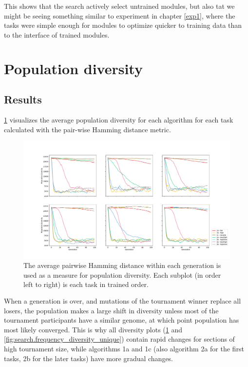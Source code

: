 This shows that the search actively select untrained modules, but also tat we might be seeing something similar to experiment in chapter \ref{exp1}, where the tasks were simple enough for modules to optimize quicker to training data than to the interface of trained modules.

\section{Population diversity}
\label{exp2:diversity}
\subsection{Results}
\ref{fig:search.hamming_diversity} visualizes the average population diversity for each algorithm for each task calculated with the pair-wise Hamming distance metric. 

\begin{figure}
    \includegraphics[width=1.2\textwidth,center]{Chapters/4.Experiments/exp2/figures/large/Average_population_diversity_reduced_hamming.pdf}
    \caption[Pair-wise Hamming distance diversity]{The average pairwise Hamming distance within each generation is used as a measure for population diversity. Each subplot (in order left to right) is each task in trained order.}
    \label{fig:search.hamming_diversity}
\end{figure}

When a generation is over, and mutations of the tournament winner replace all losers, the population makes a large shift in diversity unless most of the tournament participants have a similar genome, at which point population has most likely converged. This is why all diversity plots (\ref{fig:search.hamming_diversity} and \ref{fig:search.frequency_diversity_unique}) contain rapid changes for sections of high tournament size, while algorithms 1a and 1c (also algorithm 2a for the first tasks, 2b for the later tasks) have more gradual changes. 

